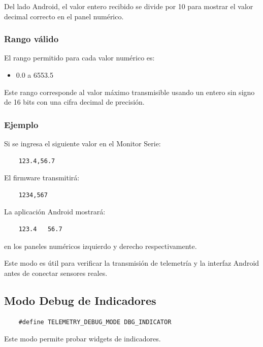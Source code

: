 Del lado Android, el valor entero recibido se divide por 10 para mostrar el valor decimal correcto en el panel numérico.

\subsubsection{Rango válido}

El rango permitido para cada valor numérico es:

\begin{itemize}
    \item 0.0 a 6553.5
\end{itemize}

Este rango corresponde al valor máximo transmisible usando un entero sin signo de 16 bits con una cifra decimal de precisión.

\subsubsection{Ejemplo}

Si se ingresa el siguiente valor en el Monitor Serie:

\begin{verbatim}
    123.4,56.7
\end{verbatim}

El firmware transmitirá:

\begin{verbatim}
    1234,567
\end{verbatim}

La aplicación Android mostrará:

\begin{verbatim}
    123.4   56.7
\end{verbatim}

en los paneles numéricos izquierdo y derecho respectivamente.

Este modo es útil para verificar la transmisión de telemetría y la interfaz Android antes de conectar sensores reales.

\subsection{Modo Debug de Indicadores}

\begin{verbatim}
    #define TELEMETRY_DEBUG_MODE DBG_INDICATOR
\end{verbatim}

Este modo permite probar widgets de indicadores.

